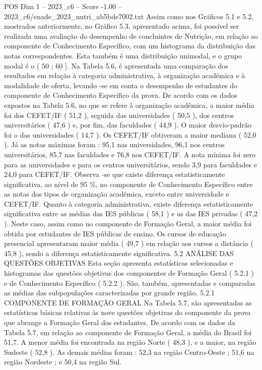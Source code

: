 \begin{textsample}{POS Dim 1 – 2023\_c6 – Score -1.00 – 2023\_c6/enade\_2023\_nutri\_ab5bde7002.txt}
Assim como nos Gráficos 5.1 e 5.2, mostrados anteriormente, no Gráfico 5.3, apresentado acima, foi possível ser realizada uma avaliação do desempenho de concluintes de Nutrição, em relação ao componente de Conhecimento Específico, com um histograma da distribuição das notas correspondentes.
Esta também é uma distribuição unimodal, e o grupo modal é o ( 50 ; 60 ].
Na Tabela 5.6, é apresentada uma comparação dos resultados em relação à categoria administrativa, à organização acadêmica e à modalidade de oferta, levando -se em conta o desempenho de estudantes do componente de Conhecimento Específico da prova.
De acordo com os dados expostos na Tabela 5.6, no que se refere à organização acadêmica, a maior média foi dos CEFET/IF ( 51,2 ), seguida das universidades ( 50,5 ), dos centros universitários ( 47,6 ) e, por fim, das faculdades ( 44,9 ).
O maior desvio-padrão foi o das universidades ( 14,7 ).
Os CEFET/IF obtiveram a maior mediana ( 52,0 ).
Já as notas máximas foram : 95,1 nas universidades, 96,1 nos centros universitários, 85,7 nas faculdades e 76,8 nos CEFET/IF.
A nota mínima foi zero para as universidades e para os centros universitários, sendo 3,9 para faculdades e 24,0 para CEFET/IF.
Observa -se que existe diferença estatisticamente significativa, ao nível de 95 \%, no componente de Conhecimento Específico entre as notas dos tipos de organização acadêmica, exceto entre universidade e CEFET/IF.
Quanto à categoria administrativa, existe diferença estatisticamente significativa entre as médias das IES públicas ( 58,1 ) e as das IES privadas ( 47,2 ).
Neste caso, assim como no componente de Formação Geral, a maior média foi obtida por estudantes de IES públicas de ensino.
Os cursos de educação presencial apresentaram maior média ( 49,7 ) em relação aos cursos a distância ( 45,8 ), sendo a diferença estatisticamente significativa. 5.2 ANÁLISE DAS QUESTÕES OBJETIVAS Esta seção apresenta estatísticas selecionadas e histogramas das questões objetivas dos componentes de Formação Geral ( 5.2.1 ) e de Conhecimento Específico ( 5.2.2 ).
São, também, apresentadas e comparadas as médias das subpopulações caracterizadas por grande região. 5.2.1 COMPONENTE DE FORMAÇÃO GERAL Na Tabela 5.7, são apresentadas as estatísticas básicas relativas às nove questões objetivas do componente da prova que abrange a Formação Geral dos estudantes.
De acordo com os dados da Tabela 5.7, em relação ao componente de Formação Geral, a média do Brasil foi 51,7.
A menor média foi encontrada na região Norte ( 48,3 ), e a maior, na região Sudeste ( 52,8 ).
As demais médias foram : 52,3 na região Centro-Oeste ; 51,6 na região Nordeste ; e 50,4 na região Sul.

\end{textsample}
